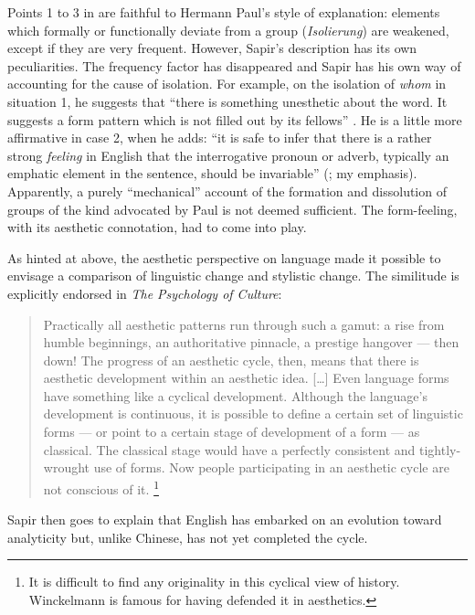 \documentclass[output=paper]{langscibook}
\begin{document}
Points 1 to 3 in  are faithful to Hermann Paul's style of explanation: elements which formally or functionally deviate from a group (\emph{Isolierung}) are weakened, except if they are very frequent. However, Sapir's description has its own peculiarities. The frequency factor has disappeared and Sapir has his own way of accounting for the cause of isolation. For example, on the isolation of \emph{whom} in situation 1, he suggests that ``there is something unesthetic about the word. It suggests a form pattern which is not filled out by its fellows'' \citep[158]{Sapir1921}. He is a little more affirmative in case 2, when he adds: ``it is safe to infer that there is a rather strong \emph{feeling} in English that the interrogative pronoun or adverb, typically an emphatic element in the sentence, should be invariable'' (\citealt[159]{Sapir1921}; my emphasis). Apparently, a purely ``mechanical'' account of the formation and dissolution of groups of the kind advocated by Paul is not deemed sufficient. The form-feeling, with its aesthetic connotation, had to come into play.

As hinted at above, the aesthetic perspective on language made it possible to envisage a comparison of linguistic change and stylistic change. The similitude is explicitly endorsed in \emph{The Psychology of Culture}:

\begin{quotation}
Practically all aesthetic patterns run through such a gamut: a rise from humble beginnings, an authoritative pinnacle, a prestige hangover — then down! The progress of an aesthetic cycle, then, means that there is aesthetic development within an aesthetic idea. […] Even language forms have something like a cyclical development. Although the language's development is continuous, it is possible to define a certain set of linguistic forms — or point to a certain stage of development of a form — as classical. The classical stage would have a perfectly consistent and tightly-wrought use of forms. Now people participating in an aesthetic cycle are not conscious of it. \citep[132--133]{Sapir2002}\footnote{It is difficult to find any originality in this cyclical view of history. Winckelmann is famous for having defended it in aesthetics.} 
\end{quotation}

Sapir then goes to explain that English has embarked on an evolution toward analyticity but, unlike Chinese, has not yet completed the cycle.
\end{document}
